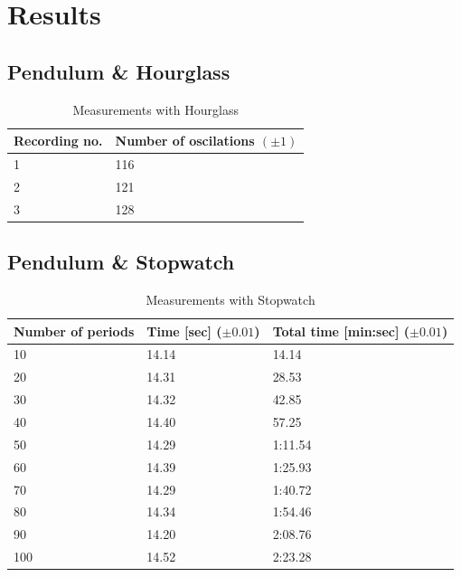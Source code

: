 \documentclass[%
 reprint,
 amsmath,amssymb,
 aps,
]{revtex4-1}
\begin{document}
\section{\label{sect:results}Results}
	\subsection{Pendulum \& Hourglass}

	\begin{table} %
        \center
        \caption{Measurements with Hourglass}
        \label{tab:hourglass}
        \begin{tabular}{| l | l |}
            \hline
            Recording no. & Number of oscilations $(\pm 1)$\\ \hline
            1 & 116 \\ \hline
            2 & 121 \\ \hline
            3 & 128 \\ \hline
        \end{tabular}
	\end{table}

	\subsection{Pendulum \& Stopwatch}

	\begin{table} %
        \center
        \caption{Measurements with Stopwatch}
        \label{tab:stopwatch}
	    \begin{tabular}{| p{1.5cm} | p{2cm} | p{2cm} |}
		    \hline
		    Number of periods & Time [sec] ($\pm 0.01$) & Total time [min:sec] ($\pm 0.01$)\\ \hline
		    10 & 14.14 & 14.14 \\ \hline
		    20 & 14.31 & 28.53 \\ \hline
		    30 & 14.32 & 42.85 \\ \hline
		    40 & 14.40 & 57.25 \\ \hline
		    50 & 14.29 & 1:11.54 \\ \hline
		    60 & 14.39 & 1:25.93 \\ \hline
		    70 & 14.29 & 1:40.72 \\ \hline
		    80 & 14.34 & 1:54.46 \\ \hline
		    90 & 14.20 & 2:08.76 \\ \hline
		    100 & 14.52 & 2:23.28 \\ \hline
        \end{tabular}
    \end{table}
    
\end{document}
